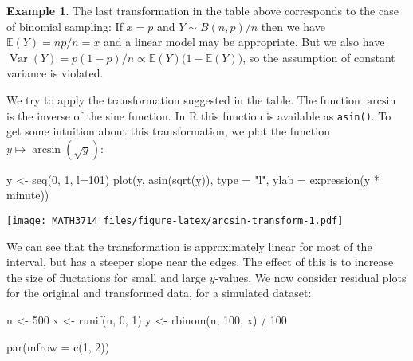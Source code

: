 \documentclass[
  a4paper,
]{article}
\newenvironment{Shaded}{\begin{snugshade}}{\end{snugshade}}
\newcommand{\AttributeTok}[1]{\textcolor[rgb]{0.77,0.63,0.00}{#1}}
\newcommand{\DecValTok}[1]{\textcolor[rgb]{0.00,0.00,0.81}{#1}}
\newcommand{\FunctionTok}[1]{\textcolor[rgb]{0.00,0.00,0.00}{#1}}
\newcommand{\NormalTok}[1]{#1}
\newcommand{\OtherTok}[1]{\textcolor[rgb]{0.56,0.35,0.01}{#1}}
\newcommand{\SpecialCharTok}[1]{\textcolor[rgb]{0.00,0.00,0.00}{#1}}
\newcommand{\StringTok}[1]{\textcolor[rgb]{0.31,0.60,0.02}{#1}}
\theoremstyle{definition}
\theoremstyle{definition}
\newtheorem{example}{Example}[section]
\theoremstyle{definition}
\theoremstyle{definition}
\theoremstyle{remark}
\begin{document}
\begin{example}
The last transformation in the table above corresponds to the case of binomial
sampling: If \(x = p\) and \(Y \sim B(n, p) / n\) then we have \(\mathbb{E}(Y) = n p / n = x\) and a linear model may be appropriate. But we also have \(\mathop{\mathrm{Var}}(Y) = p (1 - p) / n \propto \mathbb{E}(Y) \bigl( 1- \mathbb{E}(Y) \bigr)\), so the assumption of
constant variance is violated.

We try to apply the transformation suggested in the table. The
function \(\arcsin\) is the inverse of the sine function. In R
this function is available as \texttt{asin()}. To get some intuition about
this transformation, we plot the function \(y \mapsto \arcsin(\sqrt{y})\):

\begin{Shaded}
\begin{Highlighting}[]
\NormalTok{y }\OtherTok{\textless{}{-}} \FunctionTok{seq}\NormalTok{(}\DecValTok{0}\NormalTok{, }\DecValTok{1}\NormalTok{, }\AttributeTok{l=}\DecValTok{101}\NormalTok{)}
\FunctionTok{plot}\NormalTok{(y, }\FunctionTok{asin}\NormalTok{(}\FunctionTok{sqrt}\NormalTok{(y)), }\AttributeTok{type =} \StringTok{"l"}\NormalTok{,}
     \AttributeTok{ylab =} \FunctionTok{expression}\NormalTok{(y }\SpecialCharTok{*}\NormalTok{ minute))}
\end{Highlighting}
\end{Shaded}

\texttt{[image: MATH3714\_files/figure-latex/arcsin-transform-1.pdf]}

We can see that the transformation is approximately linear for most
of the interval, but has a steeper slope near the edges. The effect of
this is to increase the size of fluctations for small and large
\(y\)-values. We now consider residual plots for the original and transformed
data, for a simulated dataset:

\begin{Shaded}
\begin{Highlighting}[]
\NormalTok{n }\OtherTok{\textless{}{-}} \DecValTok{500}
\NormalTok{x }\OtherTok{\textless{}{-}} \FunctionTok{runif}\NormalTok{(n, }\DecValTok{0}\NormalTok{, }\DecValTok{1}\NormalTok{)}
\NormalTok{y }\OtherTok{\textless{}{-}} \FunctionTok{rbinom}\NormalTok{(n, }\DecValTok{100}\NormalTok{, x) }\SpecialCharTok{/} \DecValTok{100}

\FunctionTok{par}\NormalTok{(}\AttributeTok{mfrow =} \FunctionTok{c}\NormalTok{(}\DecValTok{1}\NormalTok{, }\DecValTok{2}\NormalTok{))}


\end{Highlighting}
\end{Shaded}
\end{example}
\end{document}
